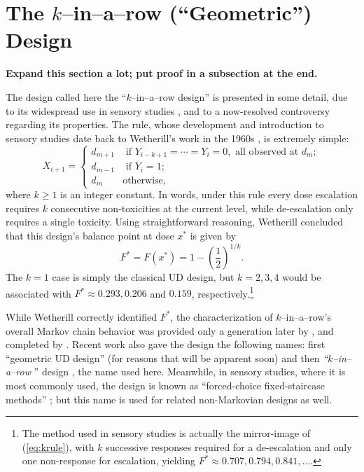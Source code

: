 \section{The $k$--in--a--row (``Geometric'') Design}\label{sec:kr}
{\bf Expand this section a lot; put proof in a subsection at the end.}

The design called here the ``$k$--in--a--row design'' is presented in some detail, due to its widespread use in sensory studies  \citep{Treu:Mini:1995}, and to a now-resolved controversy regarding its properties.  The rule, whose development and introduction to sensory studies date back to Wetherill's work in the 1960s  \citep{Weth:Sequ:1963,Weth:Levi:Sequ:1966}, is extremely simple:
%
\begin{equation}\label{eq:krule}
 X_{i+1}=
 \begin{cases}
d_{m+1} &\textrm{ if $Y_{i-k+1}=\cdots=Y_i=0$}, \textrm{ all observed at $d_m$};\\
d_{m-1} &\textrm{ if $Y_i=1$}; \\
d_m &\textrm{otherwise},
 \end{cases}
\end{equation}
\noindent where $k\geq 1$ is an integer constant. In words, under this rule every dose escalation requires $k$ consecutive non-toxicities at the current level, while de-escalation only requires a single toxicity. Using straightforward reasoning, Wetherill concluded that this design's balance point at dose $x^*$ is given by
%
\begin{equation}\label{eq:krtarget}
 F^*=F\left(x^*\right)=1-\left(\frac {1}{2}\right)^{1/k}.
\end{equation}
%
\noindent The $k=1$ case is simply the classical UD design, but $k=2,3,4$ would be associated with $F^*\approx 0.293,0.206$ and $0.159$, respectively.\footnote{The method used in sensory studies is actually the mirror-image of (\ref{eq:krule}), with $k$ successive responses required for a de-escalation and only one non-response for escalation, yielding $F^*\approx 0.707,0.794,0.841,\ldots$.}

While Wetherill correctly identified $F^*$, the characterization of $k$--in--a--row's overall Markov chain behavior was provided only a generation later by \cite{Gezm:Geom:1996}, and completed by \cite{Oron:Hoff:thek:2009}. Recent work also gave the design the following names: first ``geometric UD design'' (for reasons that will be apparent soon) and then \emph{``$k$--in--a--row} '' design \citep{Ivan:Mont:Moha:Durh:impr:2003}, the name used here. Meanwhile, in sensory studies, where it is most commonly used, the design is known as ``forced-choice fixed-staircase methods'' \citep{Treu:Mini:1995}; but this name is used for related non-Markovian designs as well.

